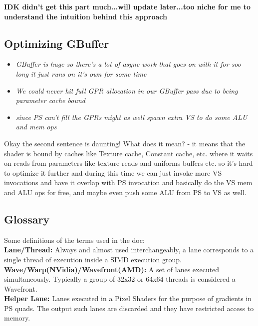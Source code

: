 \documentclass[14pt]{article}
\begin{document}
\textbf{IDK didn't get this part much...will update later...too niche for me to understand the intuition behind this approach}

\subsection*{Optimizing GBuffer}

\begin{itemize}
	\item \textit{GBuffer is huge so there's a lot of async work that goes on with it for soo long it just runs on it's own for some time}
	
	\item \textit{We could never hit full GPR allocation in our GBuffer pass due to being parameter cache bound}
	
	\item \textit{since PS can't fill the GPRs might as well spawn extra VS to do some ALU and mem ops}
\end{itemize}

Okay the second sentence is daunting! What does it mean? - it means that the shader is bound by caches like Texture cache, Constant cache, etc. \cite{caches} where it waits on reads from parameters like texture reads and uniforms buffers etc. so it's hard to optimize it further and during this time we can just invoke more VS invocations and have it overlap with PS invocation and basically do the VS mem and ALU ops for free, and maybe even push some ALU from PS to VS as well.


\subsection*{Glossary}
Some definitions of the terms used in the doc: \\

\textbf{Lane/Thread:} Always and almost used interchangeably, a lane corresponds to a single thread of execution inside a SIMD execution group.\cite{wave} \\ 

\textbf{Wave/Warp(NVidia)/Wavefront(AMD):} A set of lanes executed simultaneously. Typically a group of 32x32 or 64x64 threads is considered a Wavefront.\cite{wave} \\

\textbf{Helper Lane:} Lanes executed in a Pixel Shaders for the purpose of gradients in PS quads. The output such lanes are discarded and they have restricted access to memory.\cite{wave} \\
\end{document}

